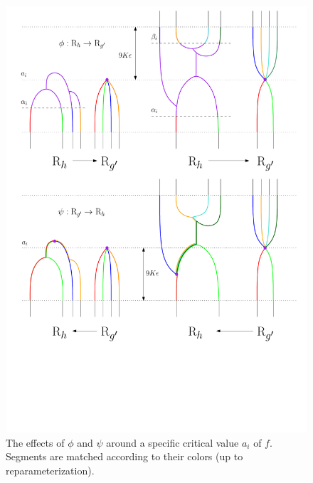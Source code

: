 \begin{figure}\centering
\includegraphics[width=14cm]{figures/ContinuousMaps}
\caption[Continuous maps]{\label{fig:fdmerge}
The effects of $\phi$ and $\psi$ around a specific critical value $a_i$ of $f$. Segments are matched according
to their colors (up to reparameterization).
}
\end{figure}

